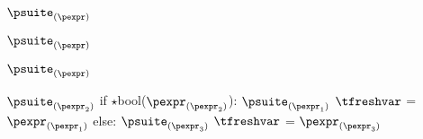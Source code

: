 \documentclass{article}
\begin{document}
\newsavebox{\notBox}
\begin{lrbox}{\notBox}
\begin{python}
$\psuite_{(\pexpr)}$
\end{python}
\end{lrbox}

\begin{mathpar}
\end{mathpar}

\newsavebox{\uplusBox}
\begin{lrbox}{\uplusBox}
\begin{python}
$\psuite_{(\pexpr)}$
\end{python}
\end{lrbox}

\begin{mathpar}
\end{mathpar}

\newsavebox{\usubBox}
\begin{lrbox}{\usubBox}
\begin{python}
$\psuite_{(\pexpr)}$
\end{python}
\end{lrbox}

\begin{mathpar}
\end{mathpar}

\newsavebox{\ifExpBox}
\begin{lrbox}{\ifExpBox}
\begin{python}
$\psuite_{(\pexpr_2)}$
if $\star$bool($\pexpr_{(\pexpr_2)}$):
  $\psuite_{(\pexpr_1)}$
  $\tfreshvar$ = $\pexpr_{(\pexpr_1)}$
else:
  $\psuite_{(\pexpr_3)}$
  $\tfreshvar$ = $\pexpr_{(\pexpr_3)}$
\end{python}
\end{lrbox}

\begin{mathpar}
\end{mathpar}
\end{document}
